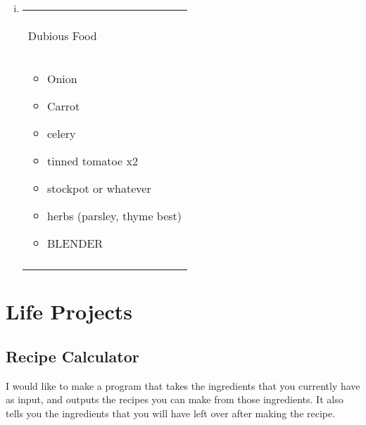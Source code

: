 \documentclass[a4paper,12pt]{article}
\numberwithin{equation}{section} %
\newcommand{\optional}[1]{\textcolor{lime}{\textit{#1}} (\textbf{optional})}
\newenvironment{recipe}[1][Dubious Food]
    {\begin{center}%
    \begin{tabular}{|p{0.8\textwidth}|}%
    \hline\\[-3ex]
    \begin{center}{\Large{#1}}\end{center}\\
    \hline
    \begin{itemize}%
    }
    { 
    \end{itemize}%
    \\\\\hline%
    \end{tabular}%
    \end{center}
    }
\begin{document}
\begin{enumerate}[(i)]
\begin{recipe}[Spinach and Feta Pie]
        \item spinach x 1.5 bags (optional: 1 bag kale, 1 spinach)
        \item feta x 1--2
        \item sundrieries
        \item \optional{pine nuts, walnuts will do for cost though}
    \end{recipe}
    \item \begin{recipe}
        \item Onion
        \item Carrot
        \item celery
        \item tinned tomatoe x2
        \item stockpot or whatever
        \item herbs (parsley, thyme best)
        \item BLENDER
    \end{recipe}

\end{enumerate}


\section{Life Projects}

\subsection{Recipe Calculator}
I would like to make a program that takes the ingredients that you currently have as input, and outputs the recipes you can make from those ingredients. It also tells you the ingredients that you will have left over after making the recipe.
\end{document}
